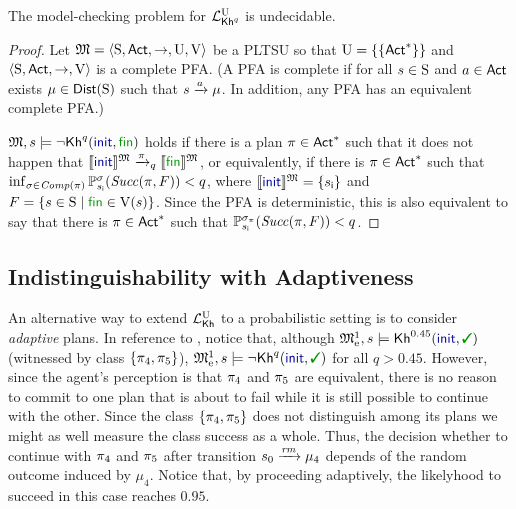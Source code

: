 \begin{theorem}\label{th:mc:PKhunc:undecidable}
  The model-checking problem for $\PKhunc$ is undecidable.
\end{theorem}
%
\begin{proof}
  Let $\model=\tup{\S,\Act,\ra,\Unc,\V}$ be a PLTSU so that
  $\Unc=\{\{\Act^*\}\}$ and $\tup{\S,\Act,\ra,\V}$ is a complete PFA.
  (A PFA is complete if for all $s\in\S$ and $a\in\Act$ exists
  $\mu\in\Dist(\S)$ such that $s\reach{a}\mu$. In addition, any PFA
  has an equivalent complete PFA.)

  $\model,s\models\neg\kh^q(\init,\fin)$ holds if there is a plan
  ${\plan\in \Act^*}$ such that it does not happen that
  ${\truthset{\model}{\init}\reach{\plan}_q\truthset{\model}{\fin}}$,
  or equivalently, if there is $\plan\in \Act^*$  such that
  $\inf_{\strat\in\Comp(\plan)}\Prob^\strat_{\sini}(\Succ(\plan,F)) < q$,
  where $\truthset{\model}{\init}=\{\sini\}$ and
  $F=\{{s\in\S}\mid{\fin\in\V(s)}\}$.
  Since the PFA is deterministic, this is also equivalent to say that
  there is $\plan\in \Act^*$ such that
  $\Prob^{\strat_\plan}_{\sini}(\Succ(\plan,F)) < q$.
  

\end{proof}
  


\subsection{Indistinguishability with Adaptiveness}\label{subsec:prob:indist:adaptive}

An alternative way to extend $\Khunc$ to a probabilistic setting is to
consider \emph{adaptive} plans.
%
In reference to , notice that, although
$\modelex^1,s \models \kh^{0.45}(\init,\goal)$ (witnessed by class
$\{\plan_4,\plan_5\}$), $\modelex^1,s \models \neg\kh^q(\init,\goal)$
for all $q>0.45$.
%
However, since the agent's perception is that $\plan_4$ and $\plan_5$
are equivalent, there is no reason to commit to one plan that is about
to fail while it is still possible to continue with the other.  Since
the class $\{\plan_4,\plan_5\}$ does not distinguish among its plans
we might as well measure the class success as a whole.
%
Thus, the decision whether to continue with $\plan_4$ and $\plan_5$
after transition $s_0\reach{\ramp}\mu_4$ depends of the random outcome
induced by $\mu_4$.  Notice that, by proceeding adaptively, the
likelyhood to succeed in this case reaches $0.95$.

